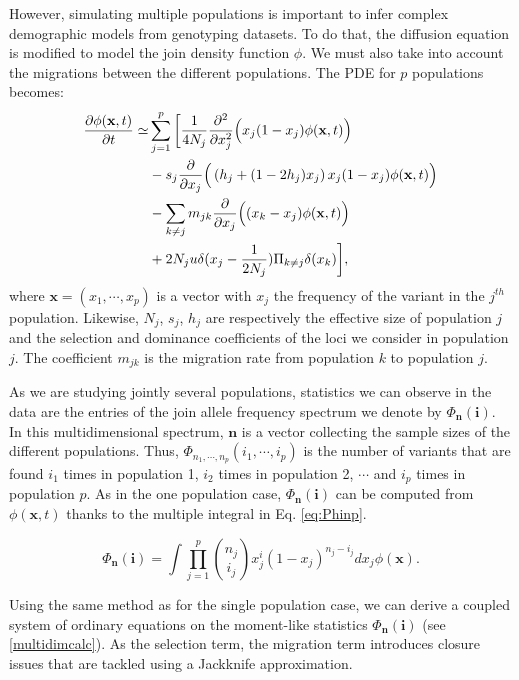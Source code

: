 However, simulating multiple populations is important to infer complex demographic models from genotyping datasets. To do that, the diffusion equation is modified to model the join density function $\phi$. We must also take into account the migrations between the different populations. The PDE for $p$ populations becomes: 
\begin{equation}
\begin{split}
\frac{\partial \phi(\textbf{x},t)}{\partial t}\simeq & \sum_{j=1}^p \bigg[ \frac{1}{4 N_j} \frac{\partial^2 }{\partial x_j^2} \Big( x_j(1-x_j) \phi(\textbf{x},t)\Big) \\
					&-s_j \frac{\partial }{\partial x_j}\Big( \left(h_j+(1-2h_j)x_j \right)x_j (1-x_j) \phi(\textbf{x},t)\Big) \\
					&-\sum_{k \neq j}m_{jk}\frac{\partial }{\partial x_j}\Big( (x_k-x_j) \phi(\textbf{x},t)\Big)\\
					&+ 2 N_j u \delta(x_j-\frac{1}{2 N_j})\Pi_{k\neq j}\delta(x_k)\bigg],
\end{split}
\label{eq:diffnp}
\end{equation}
where $\textbf{x} = (x_1, \cdots, x_p)$ is a vector with $x_j$ the frequency of the variant in the $j^{th}$ population. Likewise, $N_j$, $s_j$, $h_j$ are respectively the effective size of population $j$ and the selection and dominance coefficients of the loci we consider in population $j$. The coefficient $m_{jk}$ is the migration rate from population $k$ to population $j$.

As we are studying jointly several populations, statistics we can observe in the data are the entries of the join allele frequency spectrum we denote by $\Phi_\textbf{n}(\textbf{i})$. In this multidimensional spectrum, $\textbf{n}$ is a vector collecting the sample sizes of the different populations. Thus, $\Phi_{n_1, \cdots, n_p}(i_1, \cdots, i_p)$ is the number of variants that are found $i_1$ times in population 1, $i_2$ times in population 2, $\cdots$ and $i_p$ times in population $p$. As in the one population case, $\Phi_\textbf{n}(\textbf{i})$ can be computed from $\phi(\textbf{x},t)$ thanks to the multiple integral in Eq. \eqref{eq:Phinp}.

\begin{equation}
\Phi_{\mathbf{n}}(\mathbf{i})= \int \prod_{j=1}^p { n_j \choose i_j} x_j^i (1-x_j)^{n_j-i_j} dx_j \phi(\mathbf{x}).
\label{eq:Phinp}
\end{equation}

Using the same method as for the single population case, we can derive a coupled system of ordinary equations on the moment-like statistics $\Phi_{\mathbf{n}}(\mathbf{i})$ (see \ref{multidimcalc}). As the selection term, the migration term introduces closure issues that are tackled using a Jackknife approximation.

